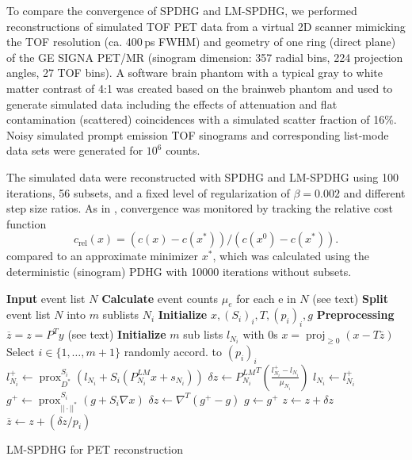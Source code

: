 \documentclass[10pt,twocolumn,twoside,letterpaper]{IEEEtran}
\DeclareMathOperator{\proj}{proj}
\DeclareMathOperator{\prox}{prox}
\begin{document}
To compare the convergence of SPDHG and LM-SPDHG, we performed reconstructions of simulated
TOF PET data from a virtual 2D scanner mimicking the TOF resolution (ca. 400\,ps FWHM) and 
geometry of one ring (direct plane) of the GE SIGNA PET/MR (sinogram dimension: 
357 radial bins, 224 projection angles, 27 TOF bins).
A software brain phantom with a typical gray to white matter contrast of 4:1 was created
based on the brainweb phantom and used to generate simulated data including the effects
of attenuation and flat contamination (scattered) coincidences
with a simulated scatter fraction of 16\%.
Noisy simulated prompt emission TOF sinograms and corresponding list-mode data sets 
were generated for $10^6$ counts.

The simulated data were reconstructed with SPDHG and LM-SPDHG using 100 iterations, 56 subsets,
and a fixed level of regularization of $\beta = 0.002$ and different step size ratios.
As in \cite{Ehrhardt2019}, convergence was monitored by tracking the relative cost function
\[ c_\text{rel}(x) = (c(x) - c(x^*)) / (c(x^0) - c(x^*)). \]
compared to an approximate minimizer $x^*$,
which was calculated using the deterministic (sinogram) PDHG with 10000 iterations without subsets.


\begin{algorithm}[t]
\begin{algorithmic}[1]
\footnotesize
\State \textbf{Input} event list $N$
\State \textbf{Calculate} event counts $\mu_e$ for each e in $N$ (see text)
\State \textbf{Split} event list $N$ into $m$ sublists $N_i$
\State \textbf{Initialize} $x,(S_i)_i,T,(p_i)_i,g$
\State \textbf{Preprocessing} $\overline{z} = z = P^T y$ (see text)
\State \textbf{Initialize} $m$ sub lists $l_{N_i}$ with 0s
\Repeat
	\State $x = \proj_{\geq 0} (x - T \overline{z})$
	\State Select $i \in \{1,\ldots,m+1\}$ randomly accord. to $(p_i)_i$
	  \State $l_{N_i}^+ \gets \prox_{D^*}^{S_i} \left( l_{N_i} + S_i \left(P^{LM}_{N_i} x + s_{N_i} \right) \right)$
	  \State $\delta z \gets {P^{LM}_{N_i}}^T \left(\frac{l_{N_i}^+ - l_{N_i}}{\mu_{N_i}}\right)$
	  \State $l_{N_i} \gets l_{N_i}^+$
  \Else
	  \State $g^+ \gets \prox_{||\cdot||^*}^{S_i} \left( g + S_i \nabla x \right)$
	  \State $\delta z \gets \nabla^T \left(g^+ - g\right)$
	  \State $g \gets g^+$
  \EndIf
	\State $z \gets z + \delta z$
	\State $\overline{z} \gets  z + (\delta z/p_i)$
\State {}
\end{algorithmic}
\caption{LM-SPDHG for PET reconstruction}
\label{alg:lmspdhg}
\end{algorithm}
\end{document}
